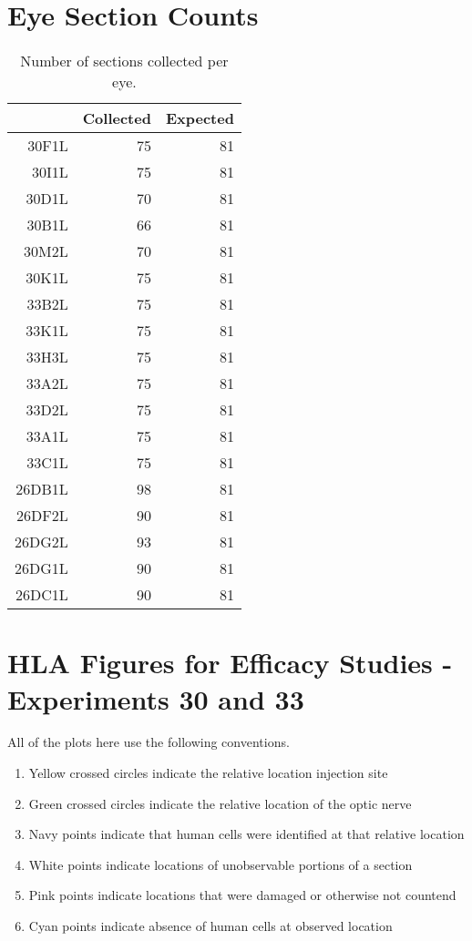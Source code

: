 \documentclass{article}
\begin{document}
\section{Eye Section Counts}
\begin{table}[ht]
\centering
\begin{tabular}{rrr}
  \hline
 & Collected & Expected \\ 
  \hline
30F1L &  75 &  81 \\ 
  30I1L &  75 &  81 \\ 
  30D1L &  70 &  81 \\ 
  30B1L &  66 &  81 \\ 
  30M2L &  70 &  81 \\ 
  30K1L &  75 &  81 \\ 
  33B2L &  75 &  81 \\ 
  33K1L &  75 &  81 \\ 
  33H3L &  75 &  81 \\ 
  33A2L &  75 &  81 \\ 
  33D2L &  75 &  81 \\ 
  33A1L &  75 &  81 \\ 
  33C1L &  75 &  81 \\ 
  26DB1L &  98 &  81 \\ 
  26DF2L  &  90 &  81 \\ 
  26DG2L &  93 &  81 \\ 
  26DG1L &  90 &  81 \\ 
  26DC1L &  90 &  81 \\ 
   \hline
\end{tabular}
\caption{Number of sections collected per eye.} 
\label{sectioncounttable}
\end{table}
\newpage

\section{HLA Figures for Efficacy Studies - Experiments 30 and 33}
All of the plots here use the following conventions. 
\begin{enumerate}
\item Yellow crossed circles indicate the relative location injection site
\item Green crossed circles indicate the relative location of the optic nerve
\item Navy points indicate that human cells were identified at that relative location
\item White points indicate locations of unobservable portions of a section
\item Pink points indicate locations that were damaged or otherwise not countend
\item Cyan points indicate absence of human cells at observed location
\end{enumerate}
\end{document}
